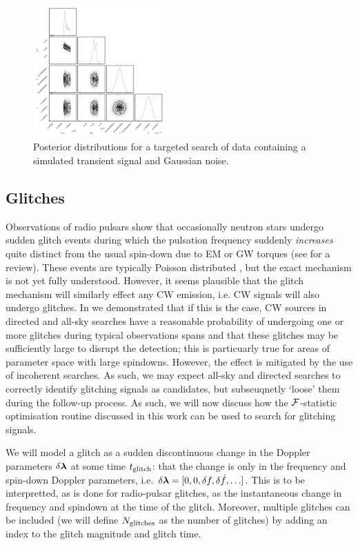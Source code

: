 \documentclass[aps, prd, twocolumn, superscriptaddress, floatfix, showpacs, nofootinbib, longbibliography]{revtex4-1}
\begin{document}
\begin{figure}[htb]
\centering
\includegraphics[width=0.45\textwidth]{transient_search_corner}
\caption{Posterior distributions for a targeted search of data containing
a simulated transient signal and Gaussian noise.}
\label{fig_transient_posterior}
\end{figure}



\subsection{Glitches}
\label{sec_glitches}

Observations of radio pulsars show that occasionally neutron stars undergo
sudden glitch events during which the pulsation frequency suddenly
\emph{increases} quite distinct from the usual spin-down due to EM or GW
torques (see \citet{espinoza2011} for a review). These events are typically
Poisson distributed \citet{melatos2008}, but the exact mechanism is not yet
fully understood. However, it seems plausible that the glitch mechanism will
similarly effect any CW emission, i.e. CW signals will also undergo glitches.
In \citet{ashton2016} we demonstrated that if this is the case, CW sources in
directed and all-sky searches have a reasonable probability of undergoing one
or more glitches during typical observations spans and that these glitches may
be sufficiently large to disrupt the detection; this is particuarly true for
areas of parameter space with large spindowns. However, the effect is mitigated
by the use of incoherent searches. As such, we may expect all-sky and directed
searches to correctly identify glitching signals as candidates, but
subseuqnetly `loose' them during the follow-up process. As such, we will now
discuss how the ${\mathcal{F}}$-statistic optimisation routine discussed in this work can
be used to search for glitching signals.

We will model a glitch as a sudden discontinuous change in the  Doppler
parameters $\delta \boldsymbol{\mathbf{\lambda}}$ at some time $t_{\rm glitch}$: that the change is only
in the frequency and spin-down Doppler parameters, i.e. $\delta\boldsymbol{\mathbf{\lambda}} = [0,
0, \delta f, \delta \dot{f}, \ldots]$. This is to be interpretted, as is done for
radio-pulsar glitches, as the instantaneous change in frequency and spindown at
the time of the glitch. Moreover, multiple glitches can be included (we will
define $N_{\rm glitches}$ as the number of glitches) by adding
an index to the glitch magnitude and glitch time.
\end{document}
